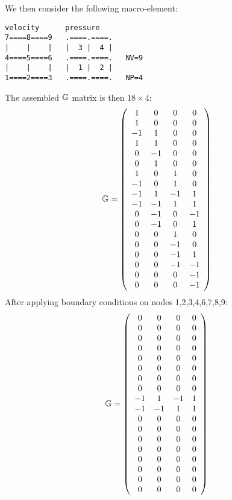 We then consider the following macro-element:

\begin{verbatim}
velocity      pressure
7====8====9   .====.====.
|    |    |   |  3 |  4 |
4====5====6   .====.====.   NV=9
|    |    |   |  1 |  2 |   
1====2====3   .====.====.   NP=4
\end{verbatim}

The assembled ${\mathbb{G}}$ matrix is then $18 \times 4$:
\[
{\mathbb{G}} = 
\left(
\begin{array}{cccc}
  1  &   0 &   0 &   0  \\ 
  1  &   0 &   0 &   0  \\ 
 -1  &   1 &   0 &   0  \\ 
  1  &   1 &   0 &   0  \\ 
  0  &  -1 &   0 &   0  \\ 
  0  &   1 &   0 &   0  \\ 
  1  &   0 &   1 &   0  \\ 
 -1  &   0 &   1 &   0  \\ 
 -1  &   1 &  -1 &   1  \\ 
 -1  &  -1 &   1 &   1  \\ 
  0  &  -1 &   0 &  -1  \\ 
  0  &  -1 &   0 &   1  \\ 
  0  &   0 &   1 &   0  \\ 
  0  &   0 &  -1 &   0  \\ 
  0  &   0 &  -1 &   1  \\ 
  0  &   0 &  -1 &  -1  \\ 
  0  &   0 &   0 &  -1  \\ 
  0  &   0 &   0 &  -1  
\end{array}
\right)
\]
After applying boundary conditions on nodes 1,2,3,4,6,7,8,9:
\[
{\mathbb{G}} = 
\left(
\begin{array}{cccc}
  0  &   0 &   0 &   0  \\ 
  0  &   0 &   0 &   0  \\ 
  0  &   0 &   0 &   0  \\ 
  0  &   0 &   0 &   0  \\ 
  0  &   0 &   0 &   0  \\ 
  0  &   0 &   0 &   0  \\ 
  0  &   0 &   0 &   0  \\ 
  0  &   0 &   0 &   0  \\ 
 -1  &   1 &  -1 &   1  \\ 
 -1  &  -1 &   1 &   1  \\ 
  0  &   0 &   0 &   0  \\ 
  0  &   0 &   0 &   0  \\ 
  0  &   0 &   0 &   0  \\ 
  0  &   0 &   0 &   0  \\ 
  0  &   0 &   0 &   0  \\ 
  0  &   0 &   0 &   0  \\ 
  0  &   0 &   0 &   0  \\ 
  0  &   0 &   0 &   0  
\end{array}
\right)
\]
